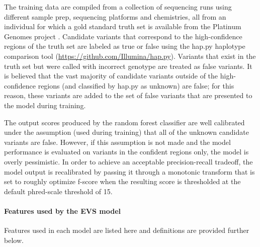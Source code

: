 \documentclass{article}
\begin{document}
The training data are compiled from a collection of sequencing runs using different sample prep, sequencing platforms and chemistries, all from an individual for which a gold standard truth set is available from the Platinum Genomes project \cite{eberle2016}. Candidate variants that correspond to the high-confidence regions of the truth set are labeled as true or false using the hap.py haplotype comparison tool (\url{https://github.com/Illumina/hap.py}). Variants that exist in the truth set but were called with incorrect genotype are treated as false variants. It is believed that the vast majority of candidate variants outside of the high-confidence regions (and classified by hap.py as unknown) are false; for this reason, these variants are added to the set of false variants that are presented to the model during training.

The output scores produced by the random forest classifier are well calibrated under the assumption (used during training) that all of the unknown candidate variants are false. However, if this assumption is not made and the model performance is evaluated on variants in the confident regions only, the model is overly pessimistic. In order to achieve an acceptable precision-recall tradeoff, the model output is recalibrated by passing it through a monotonic transform that is set to roughly optimize f-score when the resulting score is thresholded at the default phred-scale threshold of 15.

\paragraph{Features used by the EVS model}

Features used in each model are listed here and definitions are provided further below.
\end{document}
